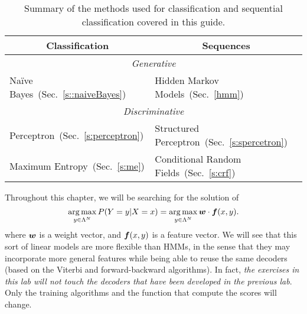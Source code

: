 \begin{table}[h!]
\centering
\begin{tabular}{|l|l|}
\hline
\multicolumn{1}{|c|}{\textbf{Classification}} & \multicolumn{1}{|c|}{\textbf{Sequences}} \\
\hline
\multicolumn{2}{|c|}{\emph{Generative}}\\
\hline
Na\"{i}ve Bayes~(Sec.~\ref{s::naiveBayes}) & Hidden Markov Models~(Sec.~\ref{hmm}) \\
\hline
\multicolumn{2}{|c|}{\emph{Discriminative}}\\
\hline
Perceptron~(Sec.~\ref{s:perceptron}) & Structured Perceptron~(Sec.~\ref{s:spercetron})\\
\hline
Maximum Entropy~(Sec.~\ref{s:me}) & Conditional Random Fields~(Sec.~\ref{s:crf})\\
\hline
\end{tabular}
\caption{\label{disc_seq_summary}Summary of the methods used for classification and sequential classification covered in this guide.}
\end{table}


Throughout this chapter, we will be searching for the solution of 
\begin{equation}
\operatorname*{arg\,max}_{y \in \Lambda^N} P(Y=y | X=x) = \operatorname*{arg\,max}_{y \in \Lambda^N} \boldsymbol{w} \cdot  \boldsymbol{f}(x,y). \label{eq::struc_pred} 
\end{equation}
where $\boldsymbol{w}$ is a weight vector, and $\boldsymbol{f}(x,y)$ is a feature vector. We will see that this sort of linear models are more flexible than HMMs, in the sense that they may incorporate 
more general features while being able to reuse the same decoders (based on the Viterbi and forward-backward algorithms). In fact, \emph{the exercises in this lab will not touch the decoders that 
have been developed in the previous lab}. 
Only the training algorithms and the function that 
compute the scores will change.

